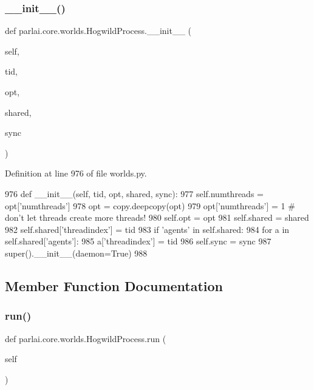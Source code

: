\subsubsection{\texorpdfstring{\+\_\+\+\_\+init\+\_\+\+\_\+()}{\_\_init\_\_()}}
{\footnotesize\ttfamily def parlai.\+core.\+worlds.\+Hogwild\+Process.\+\_\+\+\_\+init\+\_\+\+\_\+ (\begin{DoxyParamCaption}\item[{}]{self,  }\item[{}]{tid,  }\item[{}]{opt,  }\item[{}]{shared,  }\item[{}]{sync }\end{DoxyParamCaption})}



Definition at line 976 of file worlds.\+py.


\begin{DoxyCode}
976     \textcolor{keyword}{def }\_\_init\_\_(self, tid, opt, shared, sync):
977         self.numthreads = opt[\textcolor{stringliteral}{'numthreads'}]
978         opt = copy.deepcopy(opt)
979         opt[\textcolor{stringliteral}{'numthreads'}] = 1  \textcolor{comment}{# don't let threads create more threads!}
980         self.opt = opt
981         self.shared = shared
982         self.shared[\textcolor{stringliteral}{'threadindex'}] = tid
983         \textcolor{keywordflow}{if} \textcolor{stringliteral}{'agents'} \textcolor{keywordflow}{in} self.shared:
984             \textcolor{keywordflow}{for} a \textcolor{keywordflow}{in} self.shared[\textcolor{stringliteral}{'agents'}]:
985                 a[\textcolor{stringliteral}{'threadindex'}] = tid
986         self.sync = sync
987         super().\_\_init\_\_(daemon=\textcolor{keyword}{True})
988 
\end{DoxyCode}


\subsection{Member Function Documentation}
\mbox{\label{classparlai_1_1core_1_1worlds_1_1HogwildProcess_a749caf3085cb7b373db66b6f92567290}} 
\subsubsection{\texorpdfstring{run()}{run()}}
{\footnotesize\ttfamily def parlai.\+core.\+worlds.\+Hogwild\+Process.\+run (\begin{DoxyParamCaption}\item[{}]{self }\end{DoxyParamCaption})}

